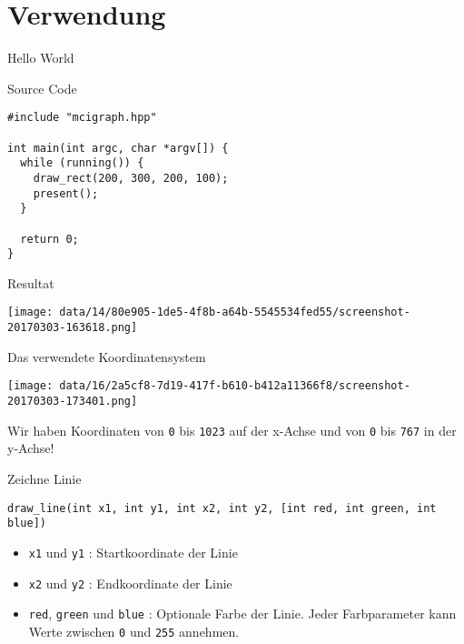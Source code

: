 \documentclass[presentation]{beamer}
\begin{document}
\section{Verwendung}
\label{sec:org9d1a5e8}
\begin{frame}[label={sec:orgea0d06e},fragile]{Hello World}
 \begin{block}{Source Code}
\begin{verbatim}
#include "mcigraph.hpp"

int main(int argc, char *argv[]) {
  while (running()) {
    draw_rect(200, 300, 200, 100);
    present();
  }

  return 0;
}
\end{verbatim}
\end{block}
\begin{block}{Resultat}
\begin{center}
\texttt{[image: data/14/80e905-1de5-4f8b-a64b-5545534fed55/screenshot-20170303-163618.png]}
\end{center}
\end{block}
\end{frame}
\begin{frame}[label={sec:org83eb116},fragile]{Das verwendete Koordinatensystem}
 \begin{center}
\texttt{[image: data/16/2a5cf8-7d19-417f-b610-b412a11366f8/screenshot-20170303-173401.png]}
\end{center}
Wir haben Koordinaten von {\color{solarizedYellow}\verb!0!} bis {\color{solarizedYellow}\verb!1023!} auf der x-Achse und von {\color{solarizedYellow}\verb!0!}
bis {\color{solarizedYellow}\verb!767!} in der y-Achse!
\end{frame}
\begin{frame}[label={sec:orgf8d0ad6},fragile]{Zeichne Linie}
 \begin{verbatim}
draw_line(int x1, int y1, int x2, int y2, [int red, int green, int blue])
\end{verbatim}
\begin{itemize}
\item {\color{solarizedYellow}\verb!x1!} und {\color{solarizedYellow}\verb!y1!} : Startkoordinate der Linie
\item {\color{solarizedYellow}\verb!x2!} und {\color{solarizedYellow}\verb!y2!} : Endkoordinate der Linie
\item {\color{solarizedYellow}\verb!red!}, {\color{solarizedYellow}\verb!green!} und {\color{solarizedYellow}\verb!blue!} : Optionale Farbe der Linie. Jeder
Farbparameter kann Werte zwischen {\color{solarizedYellow}\verb!0!} und {\color{solarizedYellow}\verb!255!} annehmen.
\end{itemize}
\end{frame}
\end{document}
